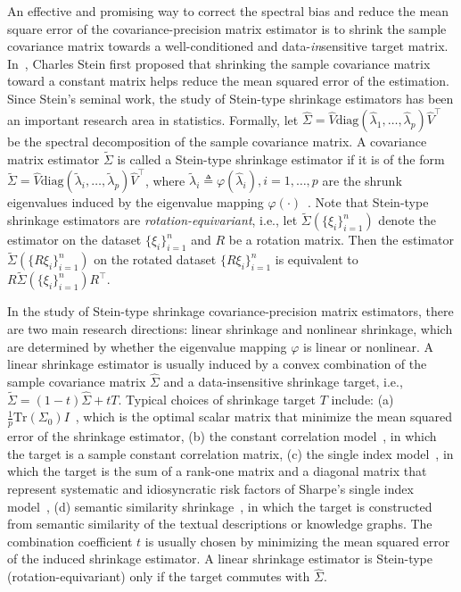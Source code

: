 \documentclass[11pt]{article}
\newcommand{\Let}{\triangleq}
\def\diag{\mathrm{diag}}
\def\transpose{\top}
\def\tr{\mathrm{Tr}}
\newcommand{\wh}{\widehat}
\begin{document}
An effective and promising way to correct the spectral bias and reduce the mean square error of the covariance-precision matrix estimator is to shrink the sample covariance matrix towards a well-conditioned and data-\textit{in}sensitive target matrix. In~\cite{ref:stein1975estimation,ref:stein1986lectures}, Charles Stein first proposed that shrinking the sample covariance matrix toward a constant matrix helps reduce the mean squared error of the estimation. 
Since Stein's seminal work, the study of Stein-type shrinkage estimators has been an important research area in statistics. Formally, let $\wh\Sigma=\widehat{V}\diag(\wh\lambda_1,\ldots,\wh\lambda_p)\widehat{V}^\transpose$ be the spectral decomposition of the sample covariance matrix. A covariance matrix estimator $\widetilde{\Sigma}$ is called a Stein-type shrinkage estimator if it is of the form $\widetilde{\Sigma}=\wh V \diag(\widetilde{\lambda}_i,\ldots,\widetilde{\lambda}_p) \wh V^\transpose$, where $\widetilde{\lambda}_i\Let\varphi(\wh\lambda_i),i=1,\ldots,p$ are the shrunk eigenvalues induced by the eigenvalue mapping $\varphi(\cdot)$~\citep{ref:condition2012won}. Note that Stein-type shrinkage estimators are {\it rotation-equivariant}, 
i.e., let $\widetilde{\Sigma}(\{\xi_i\}_{i=1}^n)$ denote the estimator on the dataset $\{\xi_i\}_{i=1}^n$ and $R$ be a rotation matrix. Then the estimator $\widetilde{\Sigma}(\{R\xi_i\}_{i=1}^n)$ on the rotated dataset $\{R\xi_i\}_{i=1}^n$ is equivalent to $R\widetilde{\Sigma}(\{\xi_i\}_{i=1}^n) R^\transpose$. 


In the study of Stein-type shrinkage covariance-precision matrix estimators, there are two main research directions: linear shrinkage and nonlinear shrinkage, which are determined by whether the eigenvalue mapping $\varphi$ is linear or nonlinear. A linear shrinkage estimator is usually induced by a convex combination of the sample covariance matrix $\wh\Sigma$ and a data-insensitive shrinkage target, i.e., $\widetilde{\Sigma}=(1- t)\wh\Sigma+ t T$. Typical choices of shrinkage target $T$ include: (a) $\frac{1}{p}\tr(\Sigma_0)I$~\citep{ref:LEDOIT2004365}, which is the optimal scalar matrix that minimize the mean squared error of the shrinkage estimator, (b) the constant correlation model~\citep{ref:ledoit2003honey}, in which the target is a sample constant correlation matrix, (c) the single index model~\citep{ref:LEDOIT2003603}, in which the target is the sum of a rank-one matrix and a diagonal matrix that represent systematic and
idiosyncratic risk factors of Sharpe's single index model~\citep{ref:sharpe1963simplified}, (d) semantic similarity shrinkage~\citep{ref:becquin2023semantic}, in which the target is constructed from semantic similarity of the textual
descriptions or knowledge graphs. The combination coefficient $ t$ is usually chosen by minimizing the mean squared error of the induced shrinkage estimator. A linear shrinkage estimator is Stein-type (rotation-equivariant) only if the target commutes with $\wh\Sigma$.
\end{document}
